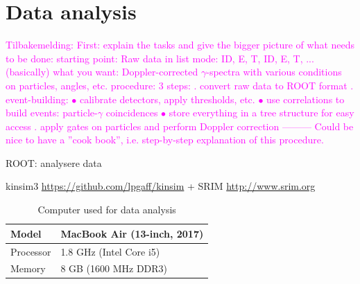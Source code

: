 \documentclass[twoside,english]{uiofysmaster/uiofysmaster}
\begin{document}



\chapter{Data analysis}  

\textcolor{Magenta}{Tilbakemelding: \newline
First: explain the tasks and give the bigger picture of what needs to be done: \newline 
starting point: Raw data in list mode: ID, E, T, ID, E, T, ... (basically) \newline
what you want: Doppler-corrected $\gamma$-spectra with various conditions on particles, angles, etc. \newline
procedure: 3 steps: . convert raw data to ROOT format . event-building: \newline
$\bullet$ calibrate detectors, apply thresholds, etc. \newline
$\bullet$ use correlations to build events: particle-$\gamma$ coincidences \newline
$\bullet$ store everything in a tree structure for easy access . apply gates on particles and perform Doppler correction \newline
--------- \newline
Could be nice to have a ''cook book'', i.e. step-by-step explanation of this procedure.
}

\bigskip

ROOT: analysere data

kinsim3 \url{https://github.com/lpgaff/kinsim} + SRIM \url{http://www.srim.org}

\bigskip


\begin{table}[H] 
\centering 
\caption{Computer used for data analysis}
\label{tab:PC}
\begin{tabular}{ll}
\hline
Model & MacBook Air (13-inch, 2017) \\
\hline
Processor & 1.8 GHz (Intel Core i5) \\
Memory & 8 GB (1600 MHz DDR3) \\
\hline
\end{tabular}
\end{table}
\end{document}
